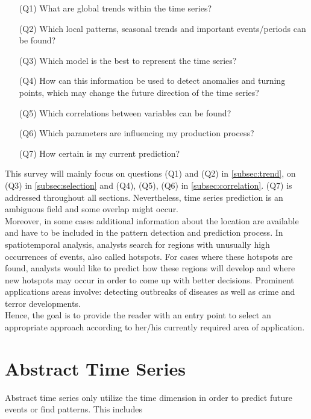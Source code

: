 \documentclass[electronic]{vgtc}             %
\begin{document}
\begin{enumerate}
	\item[(Q1)] What are global trends within the time series?
	\item[(Q2)] Which local patterns, seasonal trends and important events/periods can be found?
	\item[(Q3)] Which model is the best to represent the time series?
	\item[(Q4)] How can this information be used to detect anomalies and turning points, which may change the future direction of the time series?
	\item[(Q5)] Which correlations between variables can be found?
	\item[(Q6)] Which parameters are influencing my production process?
	\item[(Q7)] How certain is my current prediction? 
\end{enumerate}
This survey will mainly focus on questions (Q1) and (Q2) in \autoref{subsec:trend}, on (Q3) in \autoref{subsec:selection} and (Q4), (Q5), (Q6) in \autoref{subsec:correlation}.
(Q7) is addressed throughout all sections.
Nevertheless, time series prediction is an ambiguous field and some overlap might occur.\\
Moreover, in some cases additional information about the location are available and have to be included in the pattern detection and prediction process. 
In spatiotemporal analysis, analysts search for regions with unusually high occurrences of events, also called hotspots.
For cases where these hotspots are found, analysts would like to predict how these regions will develop and where new hotspots may occur in order to come up with better decisions.
Prominent applications areas involve: detecting outbreaks of diseases as well as crime and terror developments. \\
Hence, the goal is to provide the reader with an entry point to select an appropriate approach according to her/his currently required area of application. 

\section{Abstract Time Series\label{sec:temporal}}
Abstract time series only utilize the time dimension in order to predict future events or find patterns.
This includes 
\end{document}
